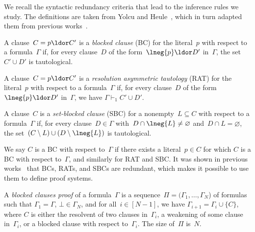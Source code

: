 \documentclass[12pt]{article}
\begin{document}
We recall the syntactic redundancy criteria that lead to the inference rules we study.
The definitions are taken from Yolcu and Heule~\cite[Section~3]{YH23},
which in turn adapted them from previous works~\cite{Kul99b,JHB12,KSTB18,HKB20,BT21}.

\begin{definition}\label{def:blocked-clause}
  A clause~$C = p \ldor C'$ is a \emph{blocked clause} (BC)
  for the literal~$p$ with respect to a formula~$\Gamma$
  if, for every clause~$D$ of the form~$\lneg{p} \ldor D'$ in~$\Gamma$,
  the set~$C' \cup D'$ is tautological.
\end{definition}

\begin{definition}\label{def:resolution-asymmetric-tautology}
  A clause~$C = p \ldor C'$ is a \emph{resolution asymmetric tautology} (RAT)
  for the literal~$p$ with respect to a formula~$\Gamma$
  if, for every clause~$D$ of the form~$\lneg{p} \ldor D'$ in~$\Gamma$,
  we have $\Gamma \vdash_1 C' \cup D'$.
\end{definition}

\begin{definition}\label{def:set-blocked-clause}
  A clause~$C$ is a \emph{set-blocked clause} (SBC)
  for a nonempty~$L \subseteq C$ with respect to a formula~$\Gamma$
  if, for every clause~$D \in \Gamma$
  with~$D \cap \lneg{L} \neq \varnothing$ and~$D \cap L = \varnothing$,
  the set~$(C \setminus L) \cup (D \setminus \lneg{L})$ is tautological.
\end{definition}

We say $C$ is a BC with respect to~$\Gamma$
if there exists a literal~$p \in C$
for which $C$ is a BC with respect to~$\Gamma$,
and similarly for RAT and SBC\@.
It was shown in previous works~\cite{Kul99b,JHB12,KSTB18}
that BCs, RATs, and SBCs are redundant,
which makes it possible to use them to define proof systems.

\begin{definition}
  A \emph{blocked clauses proof} of a formula~$\Gamma$
  is a sequence~$\Pi = (\Gamma_1, \dots, \Gamma_N$) of formulas
  such that $\Gamma_1 = \Gamma$, $\bot \in \Gamma_N$,
  and for all~$i \in [N - 1]$, we have $\Gamma_{i+1} = \Gamma_i \cup \{C\}$,
  where $C$ is either the resolvent of two clauses in~$\Gamma_i$,
  a weakening of some clause in~$\Gamma_i$,
  or a blocked clause with respect to~$\Gamma_i$.
  The size of~$\Pi$ is~$N$.
\end{definition}
\end{document}
